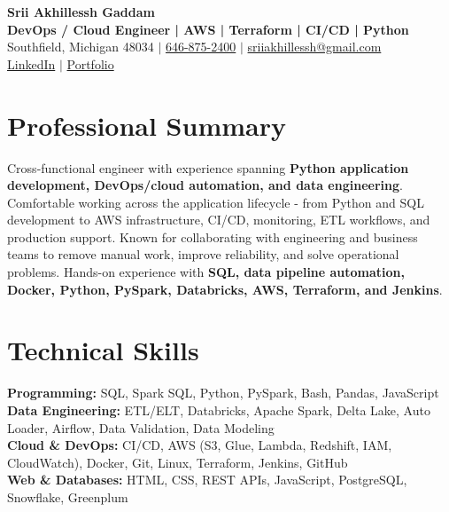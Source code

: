 \documentclass[letterpaper,10pt]{article}
\begin{document}
\fontsize{9.35pt}{10.45pt}\selectfont

\begin{center}
    {\LARGE \textbf{Srii Akhillessh Gaddam}} \\[-1pt]
    \textbf{DevOps / Cloud Engineer | AWS | Terraform | CI/CD | Python} \\[2pt]
    Southfield, Michigan 48034 $|$
    \href{tel:6468752400}{646-875-2400} $|$
    \href{mailto:sriiakhillessh@gmail.com}{sriiakhillessh@gmail.com} \\[1pt]
    \href{https://www.linkedin.com/in/srii-akhiilessh-gaddam-b48668191/}{LinkedIn} $|$
    \href{https://sriiakhillesshg.github.io/portfolio/}{Portfolio}
\end{center}
\vspace{-8pt}

\section{Professional Summary}
\small{Cross-functional engineer with experience spanning \textbf{Python application development, DevOps/cloud automation, and data engineering}. Comfortable working across the application lifecycle - from Python and SQL development to AWS infrastructure, CI/CD, monitoring, ETL workflows, and production support. Known for collaborating with engineering and business teams to remove manual work, improve reliability, and solve operational problems. Hands-on experience with \textbf{SQL, data pipeline automation, Docker, Python, PySpark, Databricks, AWS, Terraform, and Jenkins}.}

\section{Technical Skills}
\small{
\textbf{Programming:} SQL, Spark SQL, Python, PySpark, Bash, Pandas, JavaScript \\
\textbf{Data Engineering:} ETL/ELT, Databricks, Apache Spark, Delta Lake, Auto Loader, Airflow, Data Validation, Data Modeling \\
\textbf{Cloud \& DevOps:} CI/CD, AWS (S3, Glue, Lambda, Redshift, IAM, CloudWatch), Docker, Git, Linux, Terraform, Jenkins, GitHub \\
\textbf{Web \& Databases:} HTML, CSS, REST APIs, JavaScript, PostgreSQL, Snowflake, Greenplum
}
\end{document}
